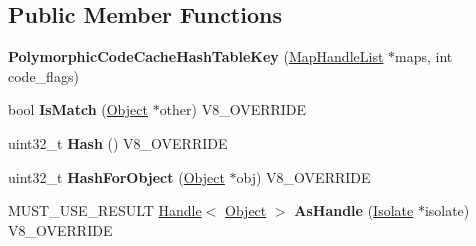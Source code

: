 \subsection*{Public Member Functions}
\begin{DoxyCompactItemize}
\item 
\hypertarget{classv8_1_1internal_1_1_polymorphic_code_cache_hash_table_key_a6dc1b2d0aa2e7bf7a5288b2eb84138fd}{}{\bfseries Polymorphic\+Code\+Cache\+Hash\+Table\+Key} (\hyperlink{classv8_1_1internal_1_1_list}{Map\+Handle\+List} $\ast$maps, int code\+\_\+flags)\label{classv8_1_1internal_1_1_polymorphic_code_cache_hash_table_key_a6dc1b2d0aa2e7bf7a5288b2eb84138fd}

\item 
\hypertarget{classv8_1_1internal_1_1_polymorphic_code_cache_hash_table_key_a41e3e514d3d844e750dd2ad938350484}{}bool {\bfseries Is\+Match} (\hyperlink{classv8_1_1internal_1_1_object}{Object} $\ast$other) V8\+\_\+\+O\+V\+E\+R\+R\+I\+D\+E\label{classv8_1_1internal_1_1_polymorphic_code_cache_hash_table_key_a41e3e514d3d844e750dd2ad938350484}

\item 
\hypertarget{classv8_1_1internal_1_1_polymorphic_code_cache_hash_table_key_aa5f1cf6bcbbe961fe093ced5d608794b}{}uint32\+\_\+t {\bfseries Hash} () V8\+\_\+\+O\+V\+E\+R\+R\+I\+D\+E\label{classv8_1_1internal_1_1_polymorphic_code_cache_hash_table_key_aa5f1cf6bcbbe961fe093ced5d608794b}

\item 
\hypertarget{classv8_1_1internal_1_1_polymorphic_code_cache_hash_table_key_ac4cbe7badbcf0b26bcda15e318736040}{}uint32\+\_\+t {\bfseries Hash\+For\+Object} (\hyperlink{classv8_1_1internal_1_1_object}{Object} $\ast$obj) V8\+\_\+\+O\+V\+E\+R\+R\+I\+D\+E\label{classv8_1_1internal_1_1_polymorphic_code_cache_hash_table_key_ac4cbe7badbcf0b26bcda15e318736040}

\item 
\hypertarget{classv8_1_1internal_1_1_polymorphic_code_cache_hash_table_key_a8492bc03e4b4f574acf2e4494b0229a0}{}M\+U\+S\+T\+\_\+\+U\+S\+E\+\_\+\+R\+E\+S\+U\+L\+T \hyperlink{classv8_1_1internal_1_1_handle}{Handle}$<$ \hyperlink{classv8_1_1internal_1_1_object}{Object} $>$ {\bfseries As\+Handle} (\hyperlink{classv8_1_1internal_1_1_isolate}{Isolate} $\ast$isolate) V8\+\_\+\+O\+V\+E\+R\+R\+I\+D\+E\label{classv8_1_1internal_1_1_polymorphic_code_cache_hash_table_key_a8492bc03e4b4f574acf2e4494b0229a0}

\end{DoxyCompactItemize}
